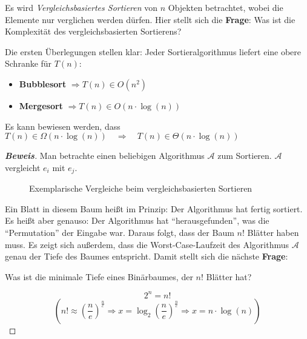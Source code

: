 \documentclass{scrartcl}%
\begin{document}
    Es wird \textit{Vergleichsbasiertes Sortieren} von $n$ Objekten betrachtet, wobei die Elemente nur verglichen werden dürfen.
    Hier stellt sich die \textbf{Frage}: Was ist die Komplexität des vergleichsbasierten Sortierens?

    Die ersten Überlegungen stellen klar: Jeder Sortieralgorithmus liefert eine obere Schranke für $T(n)$:
    \begin{itemize}
        \item \textbf{Bubblesort} $\Rightarrow T(n) \in O(n^2)$
        \item \textbf{Mergesort} $\Rightarrow T(n) \in O(n \cdot \log(n))$
    \end{itemize}
    \newpage
    \begin{theorem}
        Es kann bewiesen werden, dass $T(n) \in \Omega(n \cdot \log(n)) \quad \Rightarrow \quad T(n) \in \Theta(n \cdot \log(n))$
    \end{theorem}

    \begin{proof}[\textbf{Beweis}]
        Man betrachte einen beliebigen Algorithmus $\mathcal{A}$ zum Sortieren. $\mathcal{A}$ vergleicht $e_i$ mit $e_j$.

        \begin{figure}[htb]
            \centering

            \caption*{Exemplarische Vergleiche beim vergleichsbasierten Sortieren}
        \end{figure}

        Ein Blatt in diesem Baum heißt im Prinzip: Der Algorithmus hat fertig sortiert.
        Es heißt aber genauso: Der Algorithmus hat "`herausgefunden"', was die "`Permutation"' der Eingabe war.
        Daraus folgt, dass der Baum $n!$ Blätter haben muss.
        Es zeigt sich außerdem, dass die Worst-Case-Laufzeit des Algorithmus $\mathcal{A}$ genau der Tiefe des Baumes entspricht.
        Damit stellt sich die nächste \textbf{Frage}:

        Was ist die minimale Tiefe eines Binärbaumes, der $n!$ Blätter hat?

        \begin{equation*}
            2^n = n!
        \end{equation*}
        \begin{equation*}
            \left(n! \approx \left({\frac{n}{e}}\right)^{\frac{n}{e}} \Rightarrow x = \log_2\left(\frac{n}{e}\right)^{\frac{n}{e}}
            \Rightarrow x = n \cdot \log(n)\right)
        \end{equation*}

    \end{proof}
\end{document}
